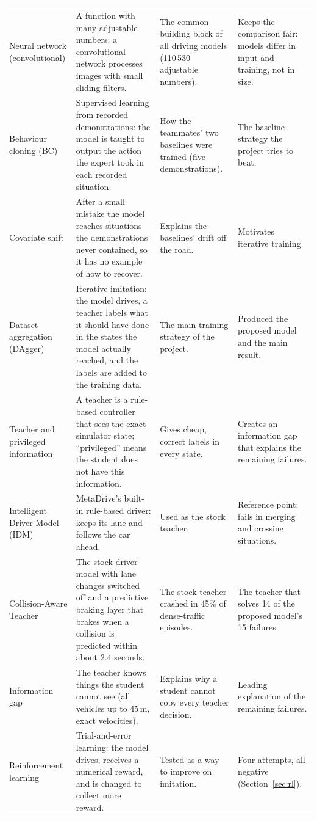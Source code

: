 {\begin{longtable}{@{}>{\raggedright\arraybackslash}p{3.1cm}>{\raggedright\arraybackslash}p{4.6cm}>{\raggedright\arraybackslash}p{3.7cm}>{\raggedright\arraybackslash}p{4.0cm}@{}}
\multicolumn{4}{@{}l}{\textbf{How models are trained}}\\
Neural network (convolutional) & A function with many adjustable numbers; a convolutional network processes images with small sliding filters. & The common building block of all driving models (110\,530 adjustable numbers). & Keeps the comparison fair: models differ in input and training, not in size.\\
Behaviour cloning (BC) & Supervised learning from recorded demonstrations: the model is taught to output the action the expert took in each recorded situation. & How the teammates' two baselines were trained (five demonstrations). & The baseline strategy the project tries to beat.\\
Covariate shift & After a small mistake the model reaches situations the demonstrations never contained, so it has no example of how to recover. & Explains the baselines' drift off the road. & Motivates iterative training.\\
Dataset aggregation (DAgger) & Iterative imitation: the model drives, a teacher labels what it should have done in the states the model actually reached, and the labels are added to the training data. & The main training strategy of the project. & Produced the proposed model and the main result.\\
Teacher and privileged information & A teacher is a rule-based controller that sees the exact simulator state; ``privileged'' means the student does not have this information. & Gives cheap, correct labels in every state. & Creates an information gap that explains the remaining failures.\\
Intelligent Driver Model (IDM) & MetaDrive's built-in rule-based driver: keeps its lane and follows the car ahead. & Used as the stock teacher. & Reference point; fails in merging and crossing situations.\\
Collision-Aware Teacher & The stock driver model with lane changes switched off and a predictive braking layer that brakes when a collision is predicted within about 2.4 seconds. & The stock teacher crashed in 45\% of dense-traffic episodes. & The teacher that solves 14 of the proposed model's 15 failures.\\
Information gap & The teacher knows things the student cannot see (all vehicles up to 45\,m, exact velocities). & Explains why a student cannot copy every teacher decision. & Leading explanation of the remaining failures.\\
Reinforcement learning & Trial-and-error learning: the model drives, receives a numerical reward, and is changed to collect more reward. & Tested as a way to improve on imitation. & Four attempts, all negative (Section~\ref{sec:rl}).\\

\end{longtable}}
